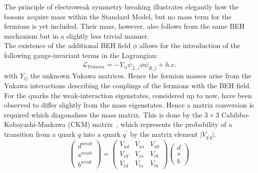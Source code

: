 The principle of electroweak symmetry breaking illustrates elegantly how the bosons acquire mass within the Standard Model, but no mass term for the fermions is yet included.
Their mass, however, also follows from the same BEH mechanism but in a slightly less trivial manner. %
\\
The existence of the additional BEH field $\phi$ allows for the introduction of the following gauge-invariant terms in the Lagrangian:
\begin{equation}
 \mathcal{L}_{Yukawa} = - Y_{ij} \bar{\psi}_{L,i} \phi \psi_{R,j} + h.c. 
\end{equation}
with $Y_{ij}$ the unknown Yukawa matrices. Hence the fermion masses arise from the Yukawa interactions describing the couplings of the fermions with the BEH field.
\\

For the quarks the weak-interaction eigenstates, considered up to now, have been observed to differ slightly from the mass eigenstates. Hence a matrix conversion is required which diagonalises the mass matrix. This is done by the $3 \times3$ Cabibbo-Kobayashi-Maskawa (CKM) matrix~\cite{CStartCKM, KMExtCKM}, which represents the probability of a transition from a quark $q$ into a quark $q^{'}$ by the matrix element $\vert V_{q^{'}q} \vert$.
\begin{equation}
 \begin{pmatrix}
  d^{weak} \\ s^{weak} \\ b^{weak} 
 \end{pmatrix}
 = \begin{pmatrix}
    V_{ud} & V_{us} & V_{ub} \\ V_{cd} & V_{cs} & V_{cb} \\ V_{td} & V_{ts} & V_{tb}
   \end{pmatrix}
   \begin{pmatrix}
    d \\ s \\ b
   \end{pmatrix}
\end{equation}

